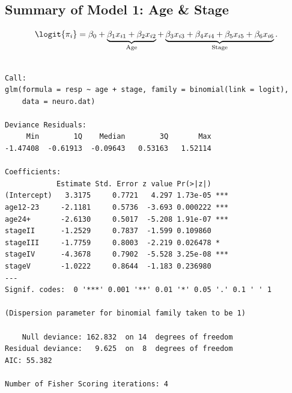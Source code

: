 \documentclass[oneside]{book}\usepackage[]{graphicx}\usepackage[svgnames]{xcolor}
\makeatletter
\newenvironment{kframe}{%
 \def\at@end@of@kframe{}%
 \ifinner\ifhmode%
  \def\at@end@of@kframe{\end{minipage}}%
  \begin{minipage}{\columnwidth}%
 \fi\fi%
 \def\FrameCommand##1{\hskip\@totalleftmargin \hskip-\fboxsep
 \colorbox{shadecolor}{##1}\hskip-\fboxsep
     \hskip-\linewidth \hskip-\@totalleftmargin \hskip\columnwidth}%
 \MakeFramed {\advance\hsize-\width
   \@totalleftmargin\z@ \linewidth\hsize
   \@setminipage}}%
 {\par\unskip\endMakeFramed%
 \at@end@of@kframe}
\newenvironment{knitrout}{}{} %
\makeatother
\begin{document}
\subsection*{Summary of Model 1: Age \& Stage}
\[ \logit{\pi_i}=\beta_0+\underbrace{\beta_1x_{i1}+\beta_2x_{i2}}_{\text{Age}}+\underbrace{\beta_3x_{i3}+\beta_4x_{i4}+\beta_5x_{i5}+\beta_6x_{i6}}_{\text{Stage}}. \]
\begin{knitrout}
\color{fgcolor}\begin{kframe}
\begin{verbatim}

Call:
glm(formula = resp ~ age + stage, family = binomial(link = logit), 
    data = neuro.dat)

Deviance Residuals: 
     Min        1Q    Median        3Q       Max  
-1.47408  -0.61913  -0.09643   0.53163   1.52114  

Coefficients:
            Estimate Std. Error z value Pr(>|z|)    
(Intercept)   3.3175     0.7721   4.297 1.73e-05 ***
age12-23     -2.1181     0.5736  -3.693 0.000222 ***
age24+       -2.6130     0.5017  -5.208 1.91e-07 ***
stageII      -1.2529     0.7837  -1.599 0.109860    
stageIII     -1.7759     0.8003  -2.219 0.026478 *  
stageIV      -4.3678     0.7902  -5.528 3.25e-08 ***
stageV       -1.0222     0.8644  -1.183 0.236980    
---
Signif. codes:  0 '***' 0.001 '**' 0.01 '*' 0.05 '.' 0.1 ' ' 1

(Dispersion parameter for binomial family taken to be 1)

    Null deviance: 162.832  on 14  degrees of freedom
Residual deviance:   9.625  on  8  degrees of freedom
AIC: 55.382

Number of Fisher Scoring iterations: 4
\end{verbatim}
\end{kframe}
\end{knitrout}
\end{document}
